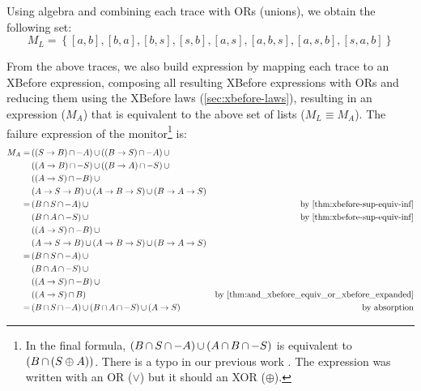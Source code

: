 \documentclass[en,twoside,onehalfspacing,phd]{risethesis}
\def\xbeforeop{\ensuremath\rightarrow}
\newcommand{\xbefore}[2]{\ensuremath #1 \xbeforeop #2 }
\newcommand{\parsin}[1]{\ensuremath\left( #1 \right)}
\def\union{\ensuremath\operatorname{\cup}}
\def\inter{\ensuremath\operatorname{\cap}}
\begin{document}
Using \ac{algebra} and combining each trace with ORs (unions), we obtain the following set:
%
\[
M_L =
  \left\{
    [a,b],[b,a],[b,s],[s,b],[a,s],
    [a,b,s],[a,s,b],[s,a,b]
  \right\}
\]

From the above traces, we also build  expression by mapping each trace to an XBefore expression, composing all resulting XBefore expressions with ORs and reducing them using the XBefore laws (\cref{sec:xbefore-laws}), resulting in an expression ($M_A$) that is equivalent to the above set of lists ($M_L \equiv M_A$).
The failure expression of the monitor\footnote{In the final formula, $\parsin{B \inter S \inter -A} \union \parsin{A \inter B \inter -S}$ is equivalent to $\parsin{B \inter \parsin{S \oplus A}}$. There is a typo in our previous work \cite{DM2015}. The expression was written with an OR ($\lor$) but it should an XOR ($\oplus$).} is:
%
\begin{align*}
M_A = & \parsin{\parsin{\xbefore{S}{B}} \inter -A} \union \parsin{\parsin{\xbefore{B}{S}} \inter -A} \union\\
  &\parsin{\parsin{\xbefore{A}{B}} \inter -S} \union \parsin{\parsin{\xbefore{B}{A}} \inter -S} \union\\
  & \parsin{\parsin{\xbefore{A}{S}} \inter -B} \union \\
  & \parsin{\xbefore{\xbefore{A}{S}}{B}} \union \parsin{\xbefore{\xbefore{A}{B}}{S}} \union \parsin{\xbefore{\xbefore{B}{A}}{S}} \\
= &\parsin{B \inter S \inter -A} \union & \text{by \eqref{thm:xbefore-sup-equiv-inf}}\\
  & \parsin{B \inter A \inter -S} \union & \text{by \eqref{thm:xbefore-sup-equiv-inf}}\\
  & \parsin{\parsin{\xbefore{A}{S}} \inter -B} \union\\
  & \parsin{\xbefore{\xbefore{A}{S}}{B}} \union \parsin{\xbefore{\xbefore{A}{B}}{S}} \union \parsin{\xbefore{\xbefore{B}{A}}{S}}\\
%
= &\parsin{B \inter S \inter -A} \union \\
  & \parsin{B \inter A \inter -S} \union \\
  & \parsin{\parsin{\xbefore{A}{S}} \inter -B} \union \\
  & \parsin{\parsin{\xbefore{A}{S}} \inter B} & \text{by \eqref{thm:and_xbefore_equiv_or_xbefore_expanded}}\\
%
= &\parsin{B \inter S \inter -A} \union \parsin{B \inter A \inter -S} \union \parsin{\xbefore{A}{S}} & \text{by absorption}
\end{align*}
\end{document}
